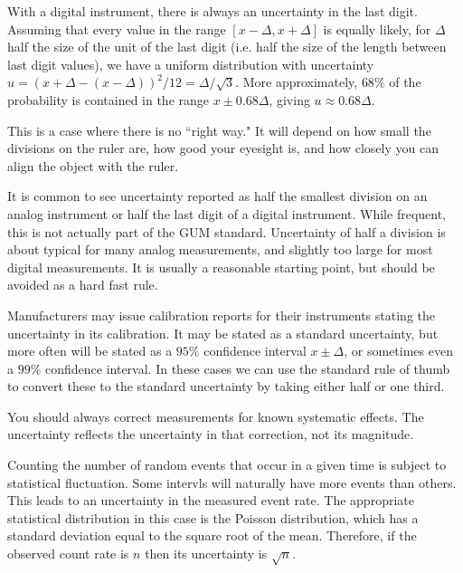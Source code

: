 \documentclass[12pt, a4paper, oneside, openright, titlepage]{book}
\begin{document}
\begin{appendices}
    \begin{eg}
        With a digital instrument, there is always an uncertainty in the last digit. Assuming that every value in the range $[x-\Delta,x+\Delta]$ is equally likely, for $\Delta$ half the size of the unit of the last digit (i.e. half the size of the length between last digit values), we have a uniform distribution with uncertainty $u = (x+\Delta - (x-\Delta))^2/12 = \Delta/\sqrt{3}$. More approximately, $68\%$ of the probability is contained in the range $x \pm 0.68\Delta$, giving $u \approx 0.68\Delta$.
    \end{eg}

    \begin{eg}
        This is a case where there is no ``right way." It will depend on how small the divisions on the ruler are, how good your eyesight is, and how closely you can align the object with the ruler.
    \end{eg}

    \begin{eg}
        It is common to see uncertainty reported as half the smallest division on an analog instrument or half the last digit of a digital instrument. While frequent, this is not actually part of the GUM standard. Uncertainty of half a division is about typical for many analog measurements, and slightly too large for most digital measurements. It is usually a reasonable starting point, but should be avoided as a hard fast rule.
    \end{eg}

    \begin{eg}
        Manufacturers may issue calibration reports for their instruments stating the uncertainty in its calibration. It may be stated as a standard uncertainty, but more often will be stated as a $95\%$ confidence interval $x \pm \Delta$, or sometimes even a $99\%$ confidence interval. In these cases we can use the standard rule of thumb to convert these to the standard uncertainty by taking either half or one third.
    \end{eg}

    \begin{eg}
        You should always correct measurements for known systematic effects. The uncertainty reflects the uncertainty in that correction, not its magnitude.
    \end{eg}

    \begin{eg}
        Counting the number of random events that occur in a given time is subject to statistical fluctuation. Some intervls will naturally have more events than others. This leads to an uncertainty in the measured event rate. The appropriate statistical distribution in this case is the Poisson distribution, which has a standard deviation equal to the square root of the mean. Therefore, if the observed count rate is $n$ then its uncertainty is $\sqrt{n}$.
    \end{eg}



\end{appendices}
\end{document}
